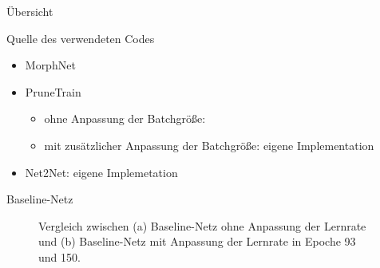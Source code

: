 \documentclass[10pt]{beamer}
\begin{document}
\begin{frame}{Übersicht}
    \tableofcontents
\end{frame}


\begin{frame}{Quelle des verwendeten Codes}
 \begin{itemize}
  \item MorphNet
  \item PruneTrain
  \begin{itemize}
    \item ohne Anpassung der Batchgröße:
    \item mit zusätzlicher Anpassung der Batchgröße: eigene Implementation
  \end{itemize}
  \item Net2Net: eigene Implemetation
 \end{itemize}
\end{frame}




\begin{frame}{Baseline-Netz}
 \begin{figure}
     \centering
     \caption{Vergleich zwischen (a) Baseline-Netz ohne Anpassung der Lernrate und (b) Baseline-Netz mit Anpassung der Lernrate in Epoche 93 und 150.}
     \label{abb:BaseAcc}
\end{figure}

\end{frame}
\end{document}
